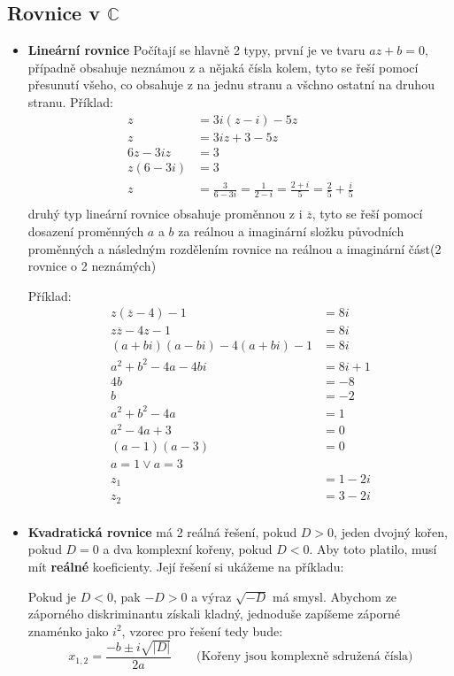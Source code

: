 \documentclass[12pt]{article}
\begin{document}
\subsection*{Rovnice v $\mathbb{C}$}
\begin{itemize} [itemsep = 2pt]
    \item \textbf{Lineární rovnice} Počítají se hlavně 2 typy, první je ve tvaru $az + b = 0$, případně obsahuje neznámou z a nějaká čísla kolem, tyto se řeší pomocí přesunutí všeho, co obsahuje z na jednu stranu a všchno ostatní na druhou stranu. Příklad: 
    \begin{align*}
    z &= 3i(z-i)-5z \\
    z &= 3iz + 3 -5z\\
    6z-3iz &= 3\\
    z(6-3i) &= 3\\
    z &= \frac{3}{6-3i} = \frac{1}{2-i} = \frac{2+i}{5} = \frac{2}{5} + \frac{i}{5}\\
    \end{align*}
    druhý typ lineární rovnice obsahuje proměnnou z i $\overline{z}$, tyto se řeší pomocí dosazení proměnných $a$ a $b$ za reálnou a imaginární složku původních proměnných a následným rozdělením rovnice na reálnou a imaginární část(2 rovnice o 2 neznámých)
    
    Příklad: 
    \begin{align*}
    z(\overline{z}-4) -1 &= 8i\\
    z\overline{z} - 4z -1 &= 8i\\
    (a+bi)(a-bi) - 4(a+bi) -1 &= 8i\\
    a^2 + b^2 - 4a - 4bi &= 8i +1\\
    4b &= -8\\
    b &= -2\\
    a^2 +b^2 - 4a &= 1\\
    a^2 - 4a + 3 &= 0\\
    (a-1)(a-3) &= 0\\
    a = 1 \vee a = 3\\
     z_1 &= 1 - 2i\\
     z_2 &= 3 - 2i\\
    \end{align*}
    \item \textbf{Kvadratická rovnice} má 2 reálná řešení, pokud $D>0$, jeden dvojný kořen, pokud $D = 0$ a dva komplexní kořeny, pokud $D < 0$. Aby toto platilo, musí mít \textbf{reálné} koeficienty. Její řešení si ukážeme na příkladu:
    
    Pokud je $D < 0$, pak $-D > 0$ a výraz $\sqrt{-D}$ má smysl. Abychom ze záporného diskriminantu získali kladný, jednoduše zapíšeme záporné znaménko jako $i^2$, vzorec pro řešení tedy bude:
    \[x_{1,2} = \frac{-b \pm i\sqrt{|D|}}{2a}\qquad \text{(Kořeny jsou komplexně sdružená čísla)}\]


\end{itemize}
\end{document}

